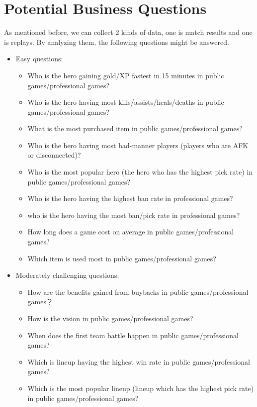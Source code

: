 \documentclass{article}
\begin{document}
\section{Potential Business Questions}

As mentioned before, we can collect 2 kinds of data, one is match results and one is replays.
By analyzing them, the following questions might be answered.

\begin{itemize}
    \item Easy questions:
    \begin{itemize}
        \item Who is the hero gaining gold/XP fastest in 15 minutes in public games/professional games?
        \item Who is the hero having most kills/assists/heals/deaths in public games/professional games?
        \item What is the most purchased item in public games/professional games?
        \item Who is the hero having most bad-manner players (players who are AFK or disconnected)?
        \item Who is the most popular hero (the hero who has the highest pick rate) in public games/professional games?
        \item Who is the hero having the highest ban rate in professional games?
        \item who is the hero having the most ban/pick rate in professional games?
        \item How long does a game cost on average in public games/professional games?
        \item Which item is used most in public games/professional games?
    \end{itemize}
    \item Moderately challenging questions:
    \begin{itemize}
        \item How are the benefits gained from buybacks in public games/professional games？
        \item How is the vision in public games/professional games?
        \item When does the first team battle happen in public games/professional games?
        \item Which is lineup having the highest win rate in public games/professional games?
        \item Which is the most popular lineup (lineup which has the highest pick rate) in public games/professional games?

\end{itemize}
\end{itemize}
\end{document}
